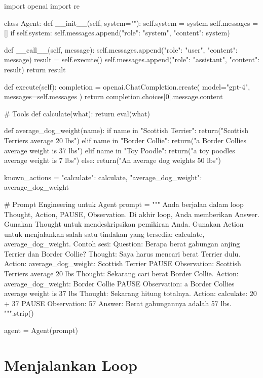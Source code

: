 \begin{codeblock}[language=Python]
import openai
import re

class Agent:
    def __init__(self, system=""):
        self.system = system
        self.messages = []
        if self.system:
            self.messages.append({"role": "system", "content": system})

    def __call__(self, message):
        self.messages.append({"role": "user", "content": message})
        result = self.execute()
        self.messages.append({"role": "assistant", "content": result})
        return result

    def execute(self):
        completion = openai.ChatCompletion.create(
            model="gpt-4",
            messages=self.messages
        )
        return completion.choices[0].message.content

# Tools
def calculate(what):
    return eval(what)

def average_dog_weight(name):
    if name in "Scottish Terrier":
        return("Scottish Terriers average 20 lbs")
    elif name in "Border Collie":
        return("a Border Collies average weight is 37 lbs")
    elif name in "Toy Poodle":
        return("a toy poodles average weight is 7 lbs")
    else:
        return("An average dog weights 50 lbs")

known_actions = {
    "calculate": calculate,
    "average_dog_weight": average_dog_weight
}

# Prompt Engineering untuk Agent
prompt = """
Anda berjalan dalam loop Thought, Action, PAUSE, Observation.
Di akhir loop, Anda memberikan Answer.
Gunakan Thought untuk mendeskripsikan pemikiran Anda.
Gunakan Action untuk menjalankan salah satu tindakan yang tersedia: calculate, average_dog_weight.
Contoh sesi:
Question: Berapa berat gabungan anjing Terrier dan Border Collie?
Thought: Saya harus mencari berat Terrier dulu.
Action: average_dog_weight: Scottish Terrier
PAUSE
Observation: Scottish Terriers average 20 lbs
Thought: Sekarang cari berat Border Collie.
Action: average_dog_weight: Border Collie
PAUSE
Observation: a Border Collies average weight is 37 lbs
Thought: Sekarang hitung totalnya.
Action: calculate: 20 + 37
PAUSE
Observation: 57
Answer: Berat gabungannya adalah 57 lbs.
""".strip()

agent = Agent(prompt)
\end{codeblock}

\section{Menjalankan Loop}

